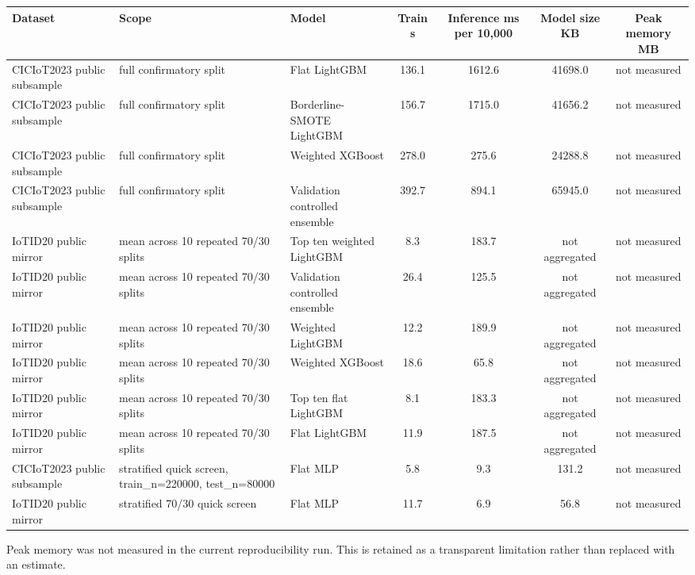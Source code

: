 \documentclass[10pt]{article}
\begin{document}
\begin{center}
\tiny
\setlength{\tabcolsep}{2pt}
\begin{longtable}{p{2.4cm}p{3.0cm}p{2.8cm}cccc}
\toprule
Dataset & Scope & Model & Train s & Inference ms per 10,000 & Model size KB & Peak memory MB \\
\midrule
\endhead
CICIoT2023 public subsample & full confirmatory split & Flat LightGBM & 136.1 & 1612.6 & 41698.0 & not measured \\
CICIoT2023 public subsample & full confirmatory split & Borderline-SMOTE LightGBM & 156.7 & 1715.0 & 41656.2 & not measured \\
CICIoT2023 public subsample & full confirmatory split & Weighted XGBoost & 278.0 & 275.6 & 24288.8 & not measured \\
CICIoT2023 public subsample & full confirmatory split & Validation controlled ensemble & 392.7 & 894.1 & 65945.0 & not measured \\
IoTID20 public mirror & mean across 10 repeated 70/30 splits & Top ten weighted LightGBM & 8.3 & 183.7 & not aggregated & not measured \\
IoTID20 public mirror & mean across 10 repeated 70/30 splits & Validation controlled ensemble & 26.4 & 125.5 & not aggregated & not measured \\
IoTID20 public mirror & mean across 10 repeated 70/30 splits & Weighted LightGBM & 12.2 & 189.9 & not aggregated & not measured \\
IoTID20 public mirror & mean across 10 repeated 70/30 splits & Weighted XGBoost & 18.6 & 65.8 & not aggregated & not measured \\
IoTID20 public mirror & mean across 10 repeated 70/30 splits & Top ten flat LightGBM & 8.1 & 183.3 & not aggregated & not measured \\
IoTID20 public mirror & mean across 10 repeated 70/30 splits & Flat LightGBM & 11.9 & 187.5 & not aggregated & not measured \\
CICIoT2023 public subsample & stratified quick screen, train\_n=220000, test\_n=80000 & Flat MLP & 5.8 & 9.3 & 131.2 & not measured \\
IoTID20 public mirror & stratified 70/30 quick screen & Flat MLP & 11.7 & 6.9 & 56.8 & not measured \\
\bottomrule
\end{longtable}
\end{center}

Peak memory was not measured in the current reproducibility run. This is retained as a transparent limitation rather than replaced with an estimate.
\end{document}
